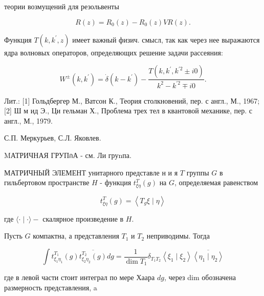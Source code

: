 \documentclass[10pt]{article}
\begin{document}
теории возмущений для резольвенты



\[

R(z)=R_{0}(z)-R_{0}(z) V R(z) .

\]



Функция $T\left(k, k^{\prime}, z\right)$ имеет важный физич. смысл, так как через нее выражаются ядра волновых операторов, определяющих решение задачи рассеяния:



\[

W^{ \pm}\left(k, k^{\prime}\right)=\dot{\delta}\left(k-k^{\prime}\right)-\frac{T\left(k, k^{\prime}, k^{\prime 2} \pm i 0\right)}{k^{2}-k^{\prime 2} \mp i 0} .

\]



Лит.: [1] Гольдбергер М., Ватсон К., Теория столкновений, пер. с англ., М., 1967; [2] Ш м ид Э., Ци гельман Х., Проблема трех тел в квантовой механике, пер. с англ., М., 1979.



С.П. Меркурьев, С.Л. Яковлев.



MАТРИЧНАЯ ГРУПกА - см. Ли груnпа.



МАТРИЧНЫЙ ЭЛЕМЕНТ унитарного представле н и я $T$ группы $G$ в гильбертовом пространстве $H$ - функция $t_{\xi \eta}^{T}(g)$ на $G$, определяемая равенством



\[

t_{\xi \eta}^{T}(g)=\left\langle T_{g} \xi \mid \eta\right\rangle

\]



где $\langle\cdot \mid \cdot\rangle-$ скалярное произведение в $H$.



Пусть $G$ компактна, а представления $T_{1}$ и $T_{2}$ неприводимы. Тогда



\[

\int t_{\xi_{1} \eta_{1}}^{T_{1}}(g) \overline{t_{\xi_{2} \eta_{2}}^{T_{2}}(g)} d g=\frac{1}{\operatorname{dim} T_{1}} \delta_{T_{1} T_{2}}\left\langle\xi_{1} \mid \xi_{2}\right\rangle \overline{\left\langle\eta_{1} \mid \eta_{2}\right\rangle}

\]



где в левой части стоит интеграл по мере Хаара $d g$, через dim обозначена размерность представления, a
\end{document}
